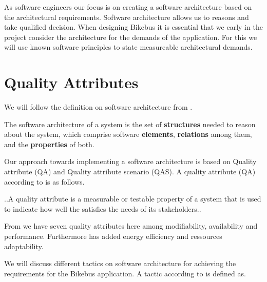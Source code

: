 As software engineers our focus is on creating a software architecture based on the architectural requirements. Software architecture allows us to reasons and take qualified decision. When designing Bikebus it is essential that we early in the project consider the architecture for the demands of the application. For this we will use known software principles to state measureable architectural demands. 

\section{Quality Attributes}
We will follow the definition on software architecture from \cite{Bass}. 
\begin{defi}
The software architecture of a system is the set of \textbf{structures} needed to reason about the system, which comprise software \textbf{elements}, \textbf{relations} among them, and the \textbf{properties} of both. 
\end{defi}


Our approach towards implementing a software architecture is based on Quality attribute (QA) and Quality attribute scenario (QAS). A quality attribute (QA) according to \cite{Bass} is as follows.

\begin{defi}
..A quality attribute is a measurable or testable property of a system that is used to indicate how well the satisfies the needs of its stakeholders..  
\end{defi}



From \cite{Bass} we have seven quality attributes here among modifiability, availability and performance. Furthermore \cite{Kjaergaard:2015:AQT:2737182.2737196} has added energy efficiency and ressources adaptability.  


We will discuss different tactics on software architecture for achieving the requirements for the Bikebus application. A tactic according to \cite{Bass} is defined as.

